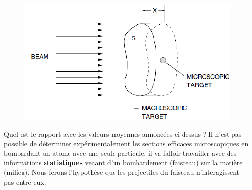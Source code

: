	\begin{figure}
	\vspace{-9mm}
	\includegraphics[scale=0.5]{ch1/image4.png}
	\end{figure}
Quel est le rapport avec les valeurs moyennes annoncées ci-dessus ? Il n'est pas possible 
de déterminer expérimentalement les sections efficaces microscopiques en bombardant un 
atome avec une seule particule, il va falloir travailler avec des informations 
\textbf{statistiques} venant d'un bombardement (faisceau) sur la matière (milieu). Nous 
ferons l'hypothèse que les projectiles du faisceau n'interagissent pas entre-eux.\newpage

